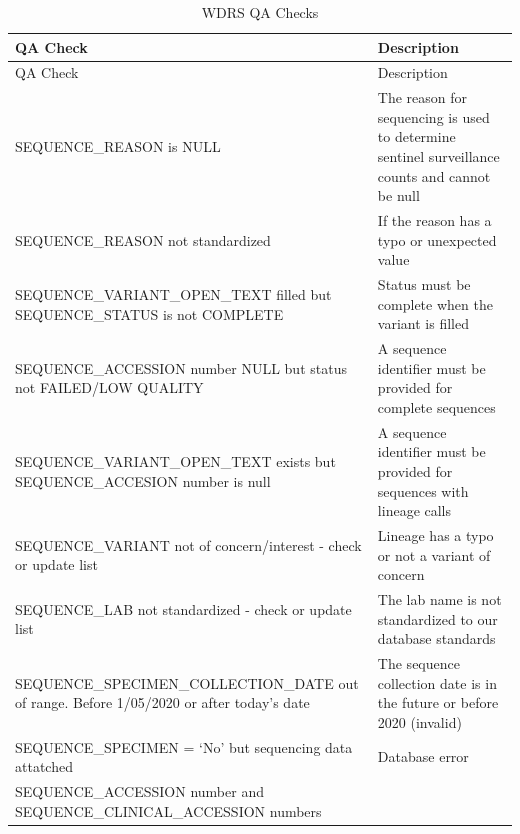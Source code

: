\documentclass[
]{agujournal2019}
\begin{document}
\begin{longtable}[]{@{}
  >{\raggedright\arraybackslash}p{}
  >{\raggedright\arraybackslash}p{}@{}}
\caption{WDRS QA Checks}\label{tbl-qachecks}\tabularnewline
\toprule\noalign{}
\begin{minipage}[b]{\linewidth}\raggedright
QA Check
\end{minipage} & \begin{minipage}[b]{\linewidth}\raggedright
Description
\end{minipage} \\
\midrule\noalign{}
\endfirsthead
\toprule\noalign{}
\begin{minipage}[b]{\linewidth}\raggedright
QA Check
\end{minipage} & \begin{minipage}[b]{\linewidth}\raggedright
Description
\end{minipage} \\
\midrule\noalign{}
\endhead
\bottomrule\noalign{}
\endlastfoot
SEQUENCE\_REASON is NULL & The reason for sequencing is used to
determine sentinel surveillance counts and cannot be null \\
SEQUENCE\_REASON not standardized & If the reason has a typo or
unexpected value \\
SEQUENCE\_VARIANT\_OPEN\_TEXT filled but SEQUENCE\_STATUS is not
COMPLETE & Status must be complete when the variant is filled \\
SEQUENCE\_ACCESSION number NULL but status not FAILED/LOW QUALITY & A
sequence identifier must be provided for complete sequences \\
SEQUENCE\_VARIANT\_OPEN\_TEXT exists but SEQUENCE\_ACCESION number is
null & A sequence identifier must be provided for sequences with lineage
calls \\
SEQUENCE\_VARIANT not of concern/interest - check or update list &
Lineage has a typo or not a variant of concern \\
SEQUENCE\_LAB not standardized - check or update list & The lab name is
not standardized to our database standards \\
SEQUENCE\_SPECIMEN\_COLLECTION\_DATE out of range. Before 1/05/2020 or
after today's date & The sequence collection date is in the future or
before 2020 (invalid) \\
SEQUENCE\_SPECIMEN = `No' but sequencing data attatched & Database
error \\
SEQUENCE\_ACCESSION number and SEQUENCE\_CLINICAL\_ACCESSION numbers

\end{longtable}
\end{document}
